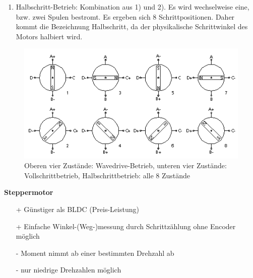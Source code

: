 \begin{description}[leftmargin=3cm]
\begin{enumerate}
								\item Halbschritt-Betrieb: Kombination aus 1) und 2). Es wird wechselweise eine, bzw. zwei Spulen bestromt. Es ergeben sich 8 Schrittpositionen. Daher kommt die Bezeichnung Halbschritt, da der physikalische Schrittwinkel des Motors halbiert wird.
							\end{enumerate}		
							\begin{figure}[h]
								\hspace{3.2cm}
								\begin{minipage}{0.75\textwidth}		
								\centering 
								\includegraphics[width=1\linewidth]{./pics/el/vollschritt}
								\caption{Oberen vier Zustände: Wavedrive-Betrieb, unteren vier Zustände: Vollschrittbetrieb,		Halbschrittbetrieb: alle 8 Zustände}
								\end{minipage}
							\end{figure} 							
						
							\item[Vor- \& Nachteile gegenüber BLDC]
							\hspace{0.5cm}
							\begin{minipage}[t]{0.38\textwidth}
								\textbf{Steppermotor}
								\begin{itemize}
									\item[+] Günstiger als BLDC (Preis-Leistung)
									\item[+] Einfache Winkel-(Weg-)messung durch Schrittzählung ohne Encoder möglich
									\item[-] Moment nimmt ab einer bestimmten Drehzahl ab	
									\item[-] nur niedrige Drehzahlen möglich
																	

\end{itemize}
\end{minipage}
\end{description}
